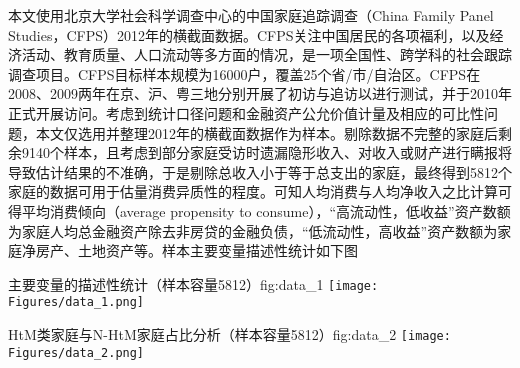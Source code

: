 \documentclass[supercite]{HustGraduPaper}
\begin{document}
    本文使用北京大学社会科学调查中心的中国家庭追踪调查（China Family Panel Studies，CFPS）2012年的横截面数据。CFPS关注中国居民的各项福利，以及经济活动、教育质量、人口流动等多方面的情况，是一项全国性、跨学科的社会跟踪调查项目。CFPS目标样本规模为16000户，覆盖25个省/市/自治区。CFPS在2008、2009两年在京、沪、粤三地分别开展了初访与追访以进行测试，并于2010年正式开展访问。考虑到统计口径问题和金融资产公允价值计量及相应的可比性问题，本文仅选用并整理2012年的横截面数据作为样本。剔除数据不完整的家庭后剩余9140个样本，且考虑到部分家庭受访时遗漏隐形收入、对收入或财产进行瞒报将导致估计结果的不准确，于是剔除总收入小于等于总支出的家庭，最终得到5812个家庭的数据可用于估量消费异质性的程度。可知人均消费与人均净收入之比计算可得平均消费倾向（average propensity to consume），“高流动性，低收益”资产数额为家庭人均总金融资产除去非房贷的金融负债，“低流动性，高收益”资产数额为家庭净房产、土地资产等。样本主要变量描述性统计如下图
    \begin{generalfig}[htbp]{主要变量的描述性统计（样本容量5812）}{fig:data_1}
    \texttt{[image: Figures/data\_1.png]}
    \end{generalfig}
    \begin{generalfig}[htbp]{HtM类家庭与N-HtM家庭占比分析（样本容量5812）}{fig:data_2}
    \texttt{[image: Figures/data\_2.png]}
    \end{generalfig}
   
\end{document}
